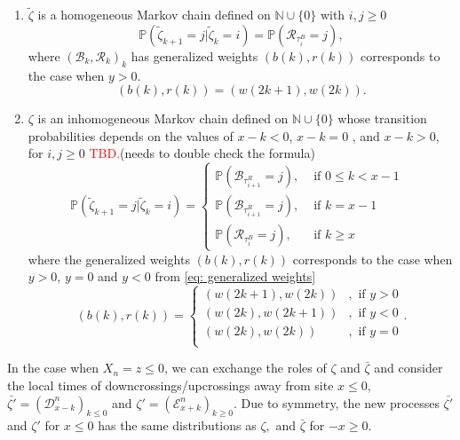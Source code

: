 \documentclass[twoside,12pt,a4paper]{article}
\numberwithin{equation}{section}
\newcommand\TBD{\textcolor{red}{TBD.}}
\begin{document}
		\begin{enumerate}
			\item $\tilde{\zeta}$ is a homogeneous Markov chain defined on  $\mathbb{N}\cup\{0\}$ with $i,j\geq 0$
			\begin{equation}\label{eq: transition prob on positive}
				\mathbb{P}\left(\tilde{\zeta}_{k+1}=j \vert \tilde{\zeta}_k =i  \right) = 
				\mathbb{P}\left( \mathcal{R}_{\tau_i^B} = j \right), 
			\end{equation} where $(\mathcal{B}_k,\mathcal{R}_k )_k$ has generalized weights $(b(k), r(k))$ corresponds to the case when $y>0$.
			$$
			(b(k), r(k)) = (w(2k+1), w(2k)).
			$$
			
			\item  $\zeta$ is an inhomogeneous Markov chain defined on  $\mathbb{N}\cup\{0\}$ whose transition probabilities depends on the values of $x-k<0$, $x-k = 0$ , and $x-k >0$, for $i,j\geq 0$
			\TBD(needs to double check the formula)
			\begin{equation}\label{eq: transition prob on positive }
				\mathbb{P}\left(\tilde{\zeta}_{k+1}=j \vert \tilde{\zeta}_k =i  \right) = 
				\begin{cases}
					\mathbb{P}\left( \mathcal{B}_{\tau_{i+1}^R} = j \right) ,& \mbox{ if $0 \leq k <  x-1$ }
					\\
					\mathbb{P}\left( \mathcal{B}_{\tau_{i+1}^R} = j \right) ,& \mbox{ if  $k =  x-1$ }
					\\
					\mathbb{P}\left( \mathcal{R}_{\tau_i^B} = j \right) ,& \mbox{ if $k \geq x$ }
				\end{cases}
			\end{equation} where the generalized weights $(b(k), r(k))$ corresponds to the case when $y>0$, $y=0$ and $y<0$ from \eqref{eq: generalized weights}
			$$
			(b(k), r(k)) = \begin{cases}
				(w(2k+1), w(2k)) &,  \text{ if }  y>0 \\
				(w(2k), w(2k+1)) &,  \text{ if }  y<0 \\  
				(w(2k), w(2k)) &,  \text{ if }  y=0 \\ 
			\end{cases}.
			$$	 
		\end{enumerate}
		In the case when $X_n = z\leq 0$, we can exchange the roles of $\zeta$ and $\bar{\zeta}$ and consider the local times of downcrossings/upcrossings away from site $x\leq 0$,  $\bar{\zeta'}= (\mathcal{D}^{n}_{x-k} )_{k\leq 0}$ and $\zeta'= (\mathcal{E}^{n}_{x+k} )_{k\geq 0}$. Due to symmetry, the new processes $\bar{\zeta'}$ and $\zeta'$ for $x\leq 0$ has the same distributions as $\zeta,$ and $\bar{\zeta}$ for $-x\geq0$.
		
\end{document}
